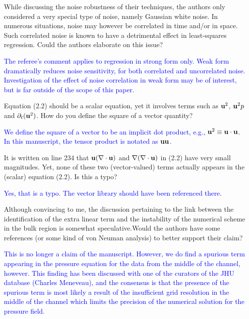 \documentclass{article}
\newcommand{\response}{\textcolor{blue}}
\begin{document}
\medskip
While discussing the noise robustness of their techniques, the authors only considered a very special type of noise, namely Gaussian white noise.  In numerous situations,  noise may however be correlated in time and/or in space.  Such correlated noise is known to have a detrimental effect in least-squares regression.  Could the authors elaborate on this issue?
    
\medskip
\response{
The referee's comment applies to regression in strong form only. Weak form dramatically reduces noise sensitivity, for both correlated and uncorrelated noise. Investigation of the effect of noise correlation in weak form may be of interest, but is far outside of the scope of this paper. 
    }
    
\medskip
Equation (2.2) should be a scalar equation, yet it involves terms such as ${\bf u}^2$, ${\bf u}^2p$ and $\partial_t ({\bf u}^2)$.  How do you define the square of a vector quantity?

\medskip
\response{We define the square of a vector to be an implicit dot product, e.g., ${\bf u}^2 \equiv {\bf u} \cdot {\bf u}$. In this manuscript, the tensor product is notated as ${\bf u} {\bf u}$.
    }
    
\medskip
It is written on line 234 that ${\bf u}(\nabla \cdot {\bf u})$ and $\nabla(\nabla\cdot {\bf u})$ in (2.2) have very small magnitudes.  Yet, none of these two (vector-valued) terms actually appears in the (scalar) equation (2.2).  Is this a typo?
    
\medskip
\response{ Yes, that is a typo. The vector library should have been referenced there.
    }
    
\medskip
Although  convincing  to  me,  the  discussion  pertaining  to  the  link between the identification of the extra linear term and the instability of the numerical scheme in the bulk region is somewhat speculative.Would the authors have some references (or some kind of von Neuman analysis) to better support their claim?
    
\medskip
\response{
This is no longer a claim of the manuscript. However, we do find a spurious term appearing in the pressure equation for the data from the middle of the channel, however. This finding has been discussed with one of the curators of the JHU database (Charles Meneveau), and the consensus is that the presence of the spurious term is most likely a result of the insufficient grid resolution in the middle of the channel which limits the precision of the numerical solution for the pressure field.}
    
\end{document}

